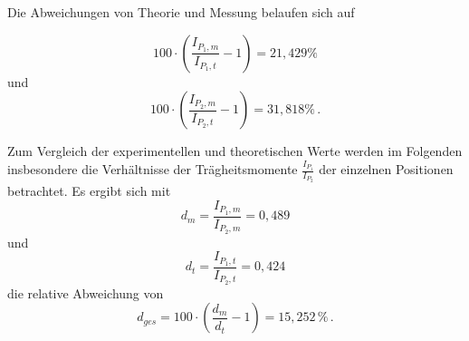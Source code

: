 Die Abweichungen von Theorie und Messung belaufen sich auf

\begin{equation*}
  100 \cdot \left(\frac{I_{P_1,m}}{I_{P_1,t}} - 1\right) = 21,429 \%
\end{equation*}
und
\begin{equation*}
  100 \cdot \left(\frac{I_{P_2,m}}{I_{P_2,t}} - 1\right) = 31,818 \% \,.
\end{equation*}

Zum Vergleich der experimentellen und theoretischen Werte werden im Folgenden insbesondere die Verhältnisse der Trägheitsmomente $\frac{I_{P_1}}{I_{P_2}}$ der einzelnen Positionen betrachtet.
Es ergibt sich mit
\begin{equation*}
  d_{m}= \frac{I_{P_1,m}}{I_{P_2,m}} = 0,489
\end{equation*}
und
\begin{equation*}
  d_{t} = \frac{I_{P_1,t}}{I_{P_2,t}} = 0,424 
\end{equation*}
die relative Abweichung von
\begin{equation*}
  d_{ges} = 100 \cdot (\frac{d_m}{d_t}-1) = 15,252 \,\% \,.
\end{equation*}
